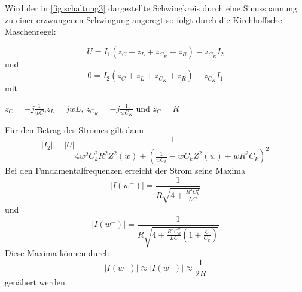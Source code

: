 Wird der in \autoref{fig:schaltung3} dargestellte Schwingkreis durch eine Sinusspannung zu einer erzwungenen Schwingung angeregt
so folgt durch die Kirchhoffsche Maschenregel:






\begin{equation}
    U = I_1 (z_C + z_L + z_{C_K} + z_R) - z_{C_K} I_2
    \label{eqn:Fuenfzehn}
\end{equation}
und
\begin{equation}
    0 = I_2 (z_C + z_L + z_{C_K} + z_R) - z_{C_K} I_1
    \label{eqn:Sechzehn}
\end{equation}
mit
\begin{center}
    $z_C = -j \frac{1}{wC}$,$z_L = jwL$, $z_{C_K} = -j \frac{1}{wC_K}$  und  $z_C = R$
\end{center}
Für den Betrag des Stromes gilt dann
\begin{equation}
    \lvert I_2\rvert = \lvert U\rvert \frac{1}{ 4w^2C_k^2R^2Z^2(w) + ( \frac{1}{wC_k} - wC_kZ^2(w) + wR^2C_k )^2 }
    \label{eqn:Zwanzig}
\end{equation}
Bei den Fundamentalfrequenzen erreicht der Strom seine Maxima
\begin{equation}
    \lvert I(w^{+})\rvert = \frac{1}{ R\sqrt{4 + \frac{R^2C_k^2}{LC}}}
    \label{eqn:Einundzwandzig}
\end{equation}
und
\begin{equation}
    \lvert I(w^{-})\rvert = \frac{1}{ R\sqrt{4 + \frac{R^2C_k^2}{LC}(1+\frac{C}{C_k})}}
    \label{eqn:Zweiundzwandzig}
\end{equation}
Diese Maxima können durch 
\begin{equation}
    \lvert I(w^{+})\rvert \approx \lvert I(w^{-})\rvert \approx \frac{1}{2R}
    \label{eqn:Dreiundzwandzig}
\end{equation}
genähert werden.


